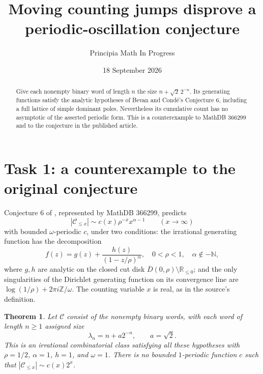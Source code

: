\documentclass[10pt]{article}
\title{Moving counting jumps disprove a\\periodic-oscillation conjecture}
\author{Principia Math In Progress}
\date{18 September 2026}
\newtheorem{theorem}{Theorem}
\begin{document}
\maketitle
\begin{abstract}
Give each nonempty binary word of length \(n\) the size
\(n+\sqrt2\,2^{-n}\). Its generating functions satisfy the analytic
hypotheses of Bevan and Cond\'e's Conjecture 6, including a full
lattice of simple dominant poles. Nevertheless its cumulative count
has no asymptotic of the asserted periodic form. This is a
counterexample to MathDB 366299 and to the conjecture in the
published article.
\end{abstract}

\section*{Task 1: a counterexample to the original conjecture}
Conjecture 6 of \cite{BC}, represented by MathDB 366299, predicts
\[
 |\mathcal C_{\le x}|\sim c(x)\rho^{-x}x^{\alpha-1}
 \qquad (x\longrightarrow\infty)
\]
with bounded \(\omega\)-periodic \(c\), under two conditions:
the irrational generating function has the decomposition
\[
 f(z)=g(z)+\frac{h(z)}{(1-z/\rho)^\alpha},
 \quad 0<\rho<1,\quad \alpha\notin-\mathbb N,
\]
where \(g,h\) are analytic on the closed cut disk
\(\overline D(0,\rho)\setminus\mathbb R_{\le0}\); and the only
singularities of the Dirichlet generating function on its convergence
line are \(\log(1/\rho)+2\pi i\mathbb Z/\omega\).
The counting variable \(x\) is real, as in the source's definition.

\begin{theorem}
Let \(\mathcal C\) consist of the nonempty binary words, with each
word of length \(n\ge1\) assigned size
\[
 \lambda_n=n+a2^{-n},\qquad a=\sqrt2.
\]
This is an irrational combinatorial class satisfying all these
hypotheses with \(\rho=1/2\), \(\alpha=1\), \(h=1\), and
\(\omega=1\). There is no bounded \(1\)-periodic function \(c\)
such that \( |\mathcal C_{\le x}|\sim c(x)2^x\).
\end{theorem}
\end{document}
